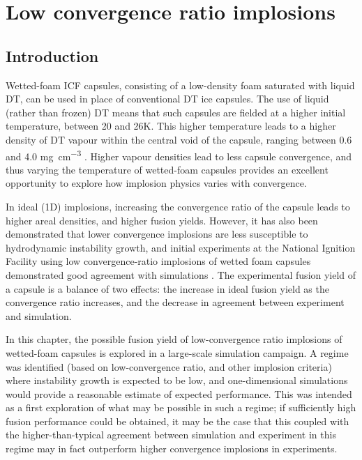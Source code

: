 

\chapter{\label{ch-lowCR}Low convergence ratio implosions}

\minitoc

\section{Introduction}

Wetted-foam ICF capsules, consisting of a low-density foam saturated with liquid DT, can be used in place of conventional DT ice capsules. The use of liquid (rather than frozen) DT means that such capsules are fielded at a higher initial temperature, between 20 and 26K. This higher temperature leads to a higher density of DT vapour within the central void of the capsule, ranging between 0.6 and 4.0 \unit{\milli\gram\per\centi\meter\cubed} \cite{Olson2016}. Higher vapour densities lead to less capsule convergence, and thus varying the temperature of wetted-foam capsules provides an excellent opportunity to explore how implosion physics varies with convergence.

In ideal (1D) implosions, increasing the convergence ratio of the capsule leads to higher areal densities, and higher fusion yields. However, it has also been demonstrated that lower convergence implosions are less susceptible to hydrodynamic instability growth, and initial experiments at the National Ignition Facility using low convergence-ratio implosions of wetted foam capsules demonstrated good agreement with simulations  \cite{Olson2016, Zylstra2018}. The experimental fusion yield of a capsule is a balance of two effects: the increase in ideal fusion yield as the convergence ratio increases, and the decrease in agreement between experiment and simulation.

In this chapter, the possible fusion yield of low-convergence ratio implosions of wetted-foam capsules is explored in a large-scale simulation campaign. A regime was identified (based on low-convergence ratio, and other implosion criteria) where instability growth is expected to be low, and one-dimensional simulations would provide a reasonable estimate of expected performance. This was intended as a first exploration of what may be possible in such a regime; if sufficiently high fusion performance could be obtained, it may be the case that this coupled with the higher-than-typical agreement between simulation and experiment in this regime may in fact outperform higher convergence implosions in experiments.

